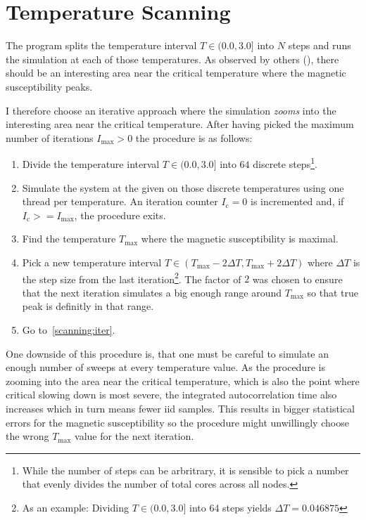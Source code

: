\section{Temperature Scanning}\label{sec:impl:scanning}
	The program splits the temperature interval $T \in (0.0, 3.0]$ into $N$ steps and runs the simulation at each of those temperatures.  As observed by others (\cite{olsson_helicity}), there should be an interesting area near the critical temperature where the magnetic susceptibility peaks.
	
	I therefore choose an iterative approach where the simulation \emph{zooms} into the interesting area near the critical temperature. After having picked the maximum number of iterations $I_\text{max} > 0$ the procedure is as follows:
	\begin{enumerate}
		\item Divide the temperature interval $T \in (0.0, 3.0]$ into $64$ discrete steps\footnote{While the number of steps can be arbritrary, it is sensible to pick a number that evenly divides the number of total cores across all nodes.}.
		\item \label{scanning:iter} Simulate the system at the given on those discrete temperatures using one thread per temperature. An iteration counter $I_\text{c} = 0$ is incremented and, if $I_\text{c} >= I_\text{max}$, the procedure exits.
		\item Find the temperature $T_\text{max}$ where the magnetic susceptibility is maximal.
		\item Pick a new temperature interval $T \in (T_\text{max} - 2 \Delta T,  T_\text{max} + 2 \Delta T)$ where $\Delta T$ is the step size from the last iteration\footnote{As an example: Dividing $T \in (0.0, 3.0]$ into $64$ steps yields $\Delta T = \num{0.046875}$}. The factor of $2$ was chosen to ensure that the next iteration simulates a big enough range around $T_\text{max}$ so that true peak is definitly in that range.
		\item Go to~\cref{scanning:iter}.
	\end{enumerate}
	One downside of this procedure is, that one must be careful to simulate an enough number of sweeps at every temperature value. As the procedure is zooming into the area near the critical temperature, which is also the point where critical slowing down is most severe, the integrated autocorrelation time also increases which in turn means fewer iid samples. This results in bigger statistical errors for the magnetic susceptibility so the procedure might unwillingly choose the wrong $T_\text{max}$ value for the next iteration.